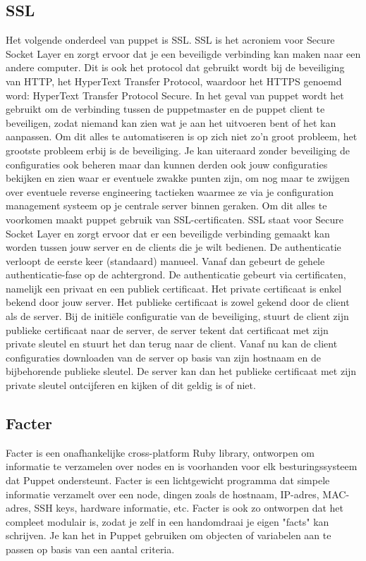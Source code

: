 \subsection{SSL}
Het volgende onderdeel van puppet is SSL. SSL is het acroniem voor Secure Socket Layer en zorgt ervoor dat je een beveiligde verbinding kan maken naar een andere computer. Dit is ook het protocol dat gebruikt wordt bij de beveiliging van HTTP, het HyperText Transfer Protocol, waardoor het HTTPS genoemd word: HyperText Transfer Protocol Secure. In het geval van puppet wordt het gebruikt om de verbinding tussen de puppetmaster en de puppet client te beveiligen, zodat niemand kan zien wat je aan het uitvoeren bent of het kan aanpassen.
%
Om dit alles te automatiseren is op zich niet zo'n groot probleem, het grootste probleem erbij is de beveiliging. Je kan uiteraard zonder beveiliging de configuraties ook beheren maar dan kunnen derden ook jouw configuraties bekijken en zien waar er eventuele zwakke punten zijn, om nog maar te zwijgen over eventuele reverse engineering tactieken waarmee ze via je configuration management systeem op je centrale server binnen geraken. Om dit alles te voorkomen maakt puppet gebruik van SSL-certificaten. SSL staat voor Secure Socket Layer en zorgt ervoor dat er een beveiligde verbinding gemaakt kan worden tussen jouw server en de clients die je wilt bedienen. De authenticatie verloopt de eerste keer (standaard) manueel. Vanaf dan gebeurt de gehele authenticatie-fase op de achtergrond. De authenticatie gebeurt via certificaten, namelijk een privaat en een publiek certificaat. Het private certificaat is enkel bekend door jouw server. Het publieke certificaat is zowel gekend door de client als de server. Bij de initi\"ele configuratie van de beveiliging, stuurt de client zijn publieke certificaat naar de server, de server tekent dat certificaat met zijn private sleutel en stuurt het dan terug naar de client. Vanaf nu kan de client configuraties downloaden van de server op basis van zijn hostnaam en de bijbehorende publieke sleutel. De server kan dan het publieke certificaat met zijn private sleutel ontcijferen en kijken of dit geldig is of niet.

\subsection{Facter}
Facter is een onafhankelijke cross-platform Ruby library, ontworpen om informatie te verzamelen over nodes en is voorhanden voor elk besturingssysteem dat Puppet ondersteunt. Facter is een lichtgewicht programma dat simpele informatie verzamelt over een node, dingen zoals de hostnaam, IP-adres, MAC-adres, SSH keys, hardware informatie, etc. Facter is ook zo ontworpen dat het compleet modulair is, zodat je zelf in een handomdraai je eigen "facts" kan schrijven. Je kan het in Puppet gebruiken om objecten of variabelen aan te passen op basis van een aantal criteria.

